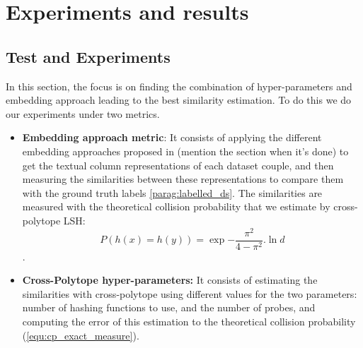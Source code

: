 \chapter{Experiments and results}
\label{chap:exp_and_tests}
\section{Test and Experiments}
In this section, the focus is on finding the combination of hyper-parameters and
embedding approach leading to the best similarity estimation. To do this we
do our experiments under two metrics.
\begin{itemize}
    \item \textbf{Embedding approach metric}: It consists of applying the
          different embedding approaches proposed in (mention the section when
          it's done) to get the textual column representations of each dataset
          couple, and then measuring the similarities between these
          representations to compare them with the ground truth labels
          \ref{parag:labelled_ds}. The similarities are measured with the
          theoretical collision probability that we estimate by cross-polytope
          LSH:
          \begin{equation}
              \label{equ:cp_exact_measure}
              P(h(x) = h(y)) = \exp{- \frac{\pi ^2}{4 - \pi ^2}. \ln{d}}
          \end{equation}.
    \item \textbf{Cross-Polytope hyper-parameters:} It consists of estimating
          the similarities with cross-polytope using different values for the
          two parameters: number of hashing functions to use, and the number of
          probes, and computing the error of this estimation to the theoretical
          collision probability (\ref{equ:cp_exact_measure}).
\end{itemize}


